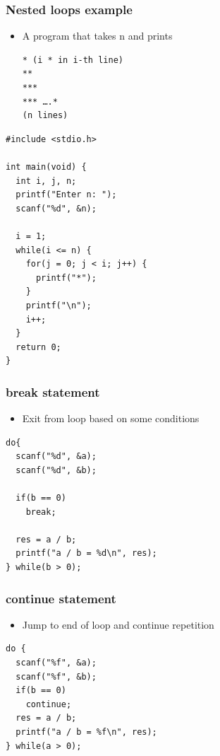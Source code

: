 \documentclass{../c-lecture}
\begin{document}
\begin{frame}[fragile]
  \frametitle{Nested loops example}
  \begin{itemize}
    \item A program that takes n and prints
    \begin{verbatim}
* (i * in i-th line)
**
***
*** ….*
(n lines)
    \end{verbatim}
  \end{itemize}
\end{frame}

\begin{frame}[fragile]
  \begin{verbatim}
#include <stdio.h>

int main(void) {
  int i, j, n;
  printf("Enter n: ");
  scanf("%d", &n);

  i = 1;
  while(i <= n) {
    for(j = 0; j < i; j++) {
      printf("*");
    }
    printf("\n");
    i++;
  }
  return 0;
}
  \end{verbatim}
\end{frame}

\begin{frame}[fragile]
  \frametitle{break statement}
  \begin{itemize}
    \item Exit from loop based on some conditions
  \end{itemize}
  \begin{verbatim}
do{
  scanf("%d", &a);
  scanf("%d", &b);

  if(b == 0)
    break;

  res = a / b;
  printf("a / b = %d\n", res);
} while(b > 0);
  \end{verbatim}
\end{frame}

\begin{frame}[fragile]
  \frametitle{continue statement}
  \begin{itemize}
    \item Jump to end of loop and continue repetition
  \end{itemize}
  \begin{verbatim}
do {
  scanf("%f", &a);
  scanf("%f", &b);
  if(b == 0)
    continue;
  res = a / b;
  printf("a / b = %f\n", res);
} while(a > 0);
  \end{verbatim}
\end{frame}
\end{document}
